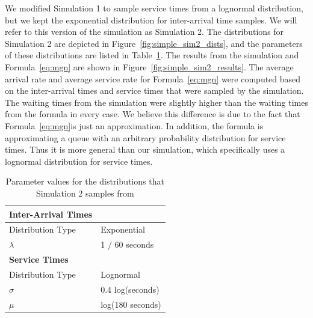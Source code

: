 We modified Simulation 1 to sample service times from a lognormal
distribution, but we kept the exponential distribution for inter-arrival time
samples.
We will refer to this version of the simulation as Simulation 2.
The distributions for Simulation 2 are depicted in
Figure~\ref{fig:simple_sim2_dists}, and the parameters of these distributions
are listed in Table~\ref{tab:sim2_params}.
The results from the simulation and Formula~\ref{eq:mgn} are shown in
Figure~\ref{fig:simple_sim2_results}.
The average arrival rate and average service rate for Formula~\ref{eq:mgn} were
computed based on the inter-arrival times and service times that were sampled by
the simulation.
The waiting times from the simulation were slightly higher than the waiting
times from the formula in every case.
We believe this difference is due to the fact that Formula~\ref{eq:mgn}is just
an approximation.
In addition, the formula is approximating a queue with an arbitrary probability
distribution for service times.
Thus it is more general than our simulation, which specifically uses a lognormal
distribution for service times.

\begin{table}
  \begin{tabular}{|l|l|}
    \hline
    \textbf{Inter-Arrival Times} & \\
    \hline
    Distribution Type & Exponential\\
    \hline
    $\lambda$ & 1 / 60 seconds\\
    \hline
    \hline
    \textbf{Service Times} & \\
    \hline
    Distribution Type & Lognormal\\
    \hline
    $\sigma$ & 0.4 log(seconds)\\
    \hline
    $\mu$ & log(180 seconds)\\
    \hline
  \end{tabular}
  \caption{
    Parameter values for the distributions that Simulation 2 samples from
  }\label{tab:sim2_params}
  \vspace{-0.1in}
\end{table}

